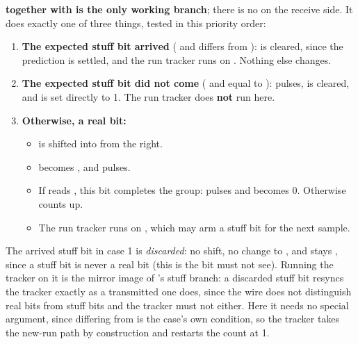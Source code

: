 \textbf{ together with  is the only working branch}; there is
no  on the receive side. It does exactly one of three things, tested in this priority
order:
\begin{enumerate}
  \item \textbf{The expected stuff bit arrived} ( and 
    differs from ):  is cleared, since the prediction is
    settled, and the run tracker runs on . Nothing else changes.
  \item \textbf{The expected stuff bit did not come} ( and 
    equal to ):  pulses,  is cleared, and
     is set directly to 1. The run tracker does \textbf{not} run here.
  \item \textbf{Otherwise, a real bit:}
    \begin{itemize}
      \item {} is shifted into  from the right.
      \item {} becomes , and  pulses.
      \item If  reads , this bit completes the group:
         pulses and  becomes 0. Otherwise  counts up.
      \item The run tracker runs on , which may arm a stuff bit for the next sample.
    \end{itemize}
\end{enumerate}

The arrived stuff bit in case 1 is \emph{discarded}: no shift, no change to , and
 stays , since a stuff bit is never a real bit (this is the bit
 must not see). Running the tracker on it is the mirror image of 's stuff
branch: a discarded stuff bit resyncs the tracker exactly as a transmitted one does, since the wire
does not distinguish real bits from stuff bits and the tracker must not either. Here it needs no
special argument, since  differing from  is the case's own condition, so
the tracker takes the new-run path by construction and restarts the count at 1.

